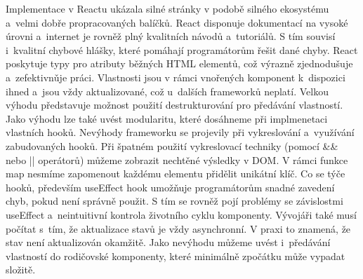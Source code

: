 Implementace v Reactu ukázala silné stránky v podobě silného ekosystému a~velmi dobře propracovaných balíčků. 
React disponuje dokumentací na vysoké úrovni a~internet je rovněž plný kvalitních návodů a~tutoriálů. 
S tím souvisí i~kvalitní chybové hlášky, které pomáhají programátorům řešit dané chyby. 
React poskytuje typy pro atributy běžných HTML elementů, což výrazně zjednodušuje a~zefektivnǔje práci. 
Vlastnosti jsou v rámci vnořených komponent k~dispozici ihned a~jsou vždy aktualizované, což u~dalších frameworků neplatí. 
Velkou výhodu představuje možnost použití destrukturování pro předávání vlastností. 
Jako výhodu lze také uvést modularitu, které dosáhneme při implmenetaci vlastních hooků. 
Nevýhody frameworku se projevily při vykreslování a~využívání zabudovaných hooků. 
Při špatném použití vykreslovací techniky (pomocí \&\& nebo || operátorů) můžeme zobrazit nechtěné výsledky v DOM. 
V rámci funkce map nesmíme zapomenout každému elementu přidělit unikátní klíč. 
Co se týče hooků, především useEffect hook umožňuje programátorům snadné zavedení chyb, pokud není správně použit. 
S tím se rovněž pojí problémy se závislostmi useEffect a~neintuitivní kontrola životního cyklu komponenty. 
Vývojáři také musí počítat s~tím, že aktualizace stavů je vždy asynchronní. V praxi to znamená, že stav není aktualizován okamžitě. 
Jako nevýhodu můžeme uvést i~předávání vlastností do rodičovské komponenty, které minimálně zpočátku může vypadat složitě.


